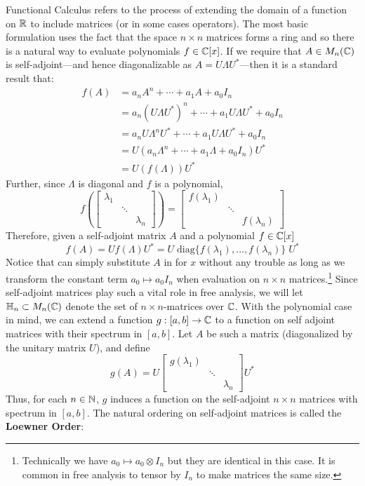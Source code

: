 Functional Calculus refers to the process of extending the domain of a function
on \(\mathbb{R}\) to include matrices (or in some cases operators). The most basic
formulation uses the fact that the space \(n \times n\) matrices forms a ring
and so there is a natural way to evaluate polynomials \(f \in \mathbb{C} [x]\). If we
require that $A \in M_n(\mathbb{C})$ is self-adjoint---and hence diagonalizable as
$A = U \Lambda U^*$---then it is a standard result that:
\begin{align*}
  f(A) &= a_nA^n + \cdots + a_1A + a_0 I_n \\
  &= a_n \left( U\Lambda U^* \right) ^n + \cdots + a_1 U\Lambda U^* + a_0 I_n \\
  &= a_n U\Lambda^n U^* + \cdots + a_1 U\Lambda U^* + a_0 I_n \\
  &= U \left( a_n\Lambda ^n + \cdots + a_1\Lambda + a_0 I_n \right) U^* \\
  &= U \left( f(\Lambda) \right) U^*
\end{align*}
Further, since \(\Lambda\) is diagonal and $f$ is a polynomial,
\[
  f \left( \begin{bmatrix} \lambda_1 &  &  \\  & \ddots &  \\  &  & \lambda_n \end{bmatrix}  \right)
  = \begin{bmatrix} f(\lambda_1) &  &  \\  & \ddots &  \\  &  & f(\lambda_n) \end{bmatrix}
\]
Therefore, given a self-adjoint matrix \(A\) and a polynomial \(f \in \mathbb{C} [x]\)
\[
  f(A) = Uf(\Lambda)U^* = U \;\text{diag}\{f(\lambda_{1}), \dots , f(\lambda_n)\} \; U^*
\]
Notice that can simply substitute \(A\) in for \(x\) without any trouble as long
as we transform the constant term \(a_0 \mapsto a_0I_n\) when evaluation on
\(n\times n\) matrices.\footnote{Technically we have
  \(a_0 \mapsto a_0 \otimes I_n\) but they are identical in this case. It is common in free
  analysis to tensor by \(I_n\) to {\color{red} make matrices the same size}.}
Since self-adjoint matrices play such a vital role in free analysis, we will let
\(\mathbb{H}_n \subset M_n(\mathbb{C})\) denote the set of \(n \times n\)-matrices over \(\mathbb{C} \).
With the polynomial case in mind, we can extend a function \(g: [a,b] \to \mathbb{C} \)
to a function on self adjoint matrices with their
spectrum in \([a,b]\). Let \(A\) be such a matrix (diagonalized by the unitary
matrix \(U\)), and define
\[
  g(A) = U
  \begin{bmatrix} g(\lambda_1) & &\\ &\ddots& \\ & & \lambda_n \end{bmatrix}
  U^*
\]
Thus, for each \(n \in \mathbb{N} \), \(g\) induces a function on the self-adjoint
\(n \times n\) matrices with spectrum in \([a,b]\).  The natural ordering
 on self-adjoint matrices is called the
\textbf{Loewner Order}:

